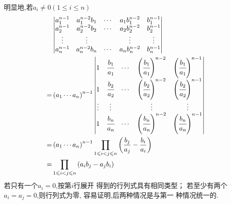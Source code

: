 \begin{solution}
	明显地,若$a_i\neq 0\left(
		1\leqslant 
		i \leqslant n
	\right)$
	\begin{align*}
		&\begin{vmatrix}
	a_1^{n-1}&a_1^{n-2}b_1&\cdots&a_1b_1^{n-2}&b_1^{n-1}\\
	a_2^{n-1}&a_2^{n-2}b_2&\cdots&a_2b_2^{n-2}&b_2^{n-1}\\
	\vdots&\vdots&&\vdots&\vdots\\
	a_n^{n-1}&a_n^{n-2}b_n&\cdots&a_nb_n^{n-2}&b_n^{n-1}
	\end{vmatrix}\\=
&\left(a_1\cdots a_n\right)
^{n-1}
	\begin{vmatrix}
	1&\cfrac{b_1}{a_1}&\cdots&\left(
		\cfrac{b_1}{a_1}
	\right)^{n-2}&\left(
		\cfrac{b_1}{a_1}
	\right)^{n-1}\\
	1&\cfrac{b_2}{a_2}&\cdots&\left(
		\cfrac{b_2}{a_2}
	\right)^{n-2}&\left(
		\cfrac{b_2}{a_2}
	\right)^{n-1}\\
	\vdots&\vdots&&\vdots&\vdots\\
	1&\cfrac{b_n}{a_n}&\cdots&\left(
		\cfrac{b_n}{a_n}
	\right)^{n-2}&\left(
		\cfrac{b_n}{a_n}
	\right)^{n-1}
	\end{vmatrix}\\
	=&\left(a_1\cdots a_n\right)
	^{n-1}
	\prod _{1\leqslant i
	< j \leqslant n}\left(
		\frac{b_j}{a_j}-
		\frac{b_i}{a_i}
	\right)\\
	=&\prod _{1\leqslant i
	< j \leqslant n}
	\left(a_ib_j-a_jb_i\right)
\end{align*}
若只有一个$a_i=0$,按第$i$行展开
得到的行列式具有相同类型；
若至少有两个$a_i=a_j=0$,则行列式为零,
容易证明,后两种情况是与第一
种情况统一的.
\end{solution}

